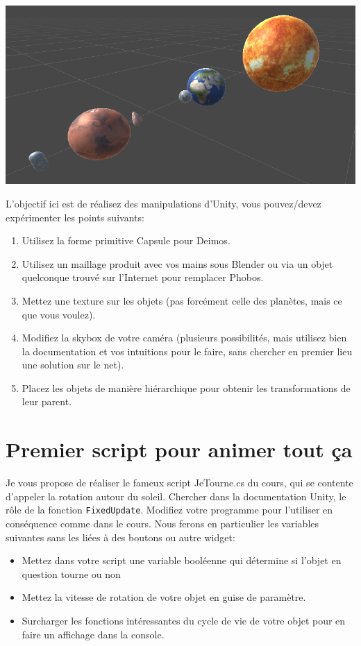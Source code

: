 \documentclass[a4paper,10pt]{article}
\begin{document}
\begin{center}
	\includegraphics[width=0.7\linewidth]{rc/solarsystem_ez}
\end{center}

L'objectif ici est de réalisez des manipulations d'Unity, vous pouvez/devez expérimenter les points suivants:
\begin{enumerate}
	\item Utilisez la forme primitive Capsule pour Deimos.
	\item Utilisez un maillage produit avec vos mains sous Blender ou via un objet quelconque trouvé sur l'Internet pour remplacer Phobos.
	\item Mettez une texture sur les objets (pas forcément celle des planètes, mais ce que vous voulez).
	\item Modifiez la skybox de votre caméra (plusieurs possibilités, mais utilisez bien la documentation et vos intuitions pour le faire, sans chercher en premier lieu une solution sur le net).
	\item Placez les objets de manière hiérarchique pour obtenir les transformations de leur parent.
\end{enumerate}




\section{Premier script pour animer tout ça}

Je vous propose de réaliser le fameux script JeTourne.cs du cours, qui se contente d'appeler la rotation autour du soleil. Chercher dans la documentation Unity, le rôle de la fonction \texttt{FixedUpdate}. Modifiez votre programme pour l'utiliser en conséquence comme dans le cours. Nous ferons en particulier les variables suivantes sans les liées à des boutons ou autre widget:
\begin{itemize}
	\item Mettez dans votre script une variable booléenne qui détermine si l'objet en question tourne ou non
	\item Mettez la vitesse de rotation de votre objet en guise de paramètre.
	\item Surcharger les fonctions intéressantes du cycle de vie de votre objet pour en faire un affichage dans la console. 
\end{itemize}
\end{document}
